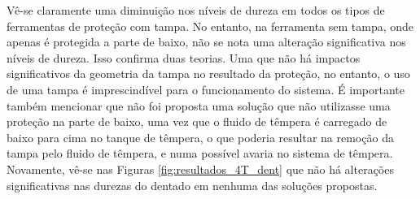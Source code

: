 \newpage
\par
Vê-se claramente uma diminuição nos níveis de dureza em todos os tipos de ferramentas de proteção com tampa. No entanto, na ferramenta sem tampa, onde apenas é protegida a parte de baixo, não se nota uma alteração significativa nos níveis de dureza. Isso confirma duas teorias. Uma que não há impactos significativos da geometria da tampa no resultado da proteção, no entanto, o uso de uma tampa é imprescindível para o funcionamento do sistema. É importante também mencionar que não foi proposta uma solução que não utilizasse uma proteção na parte de baixo, uma vez que o fluido de têmpera é carregado de baixo para cima no tanque de têmpera, o que poderia resultar na remoção da tampa pelo fluido de têmpera, e numa possível avaria no sistema de têmpera. Novamente, vê-se nas Figuras \ref{fig:resultados_4T_dent} que não há alterações significativas nas durezas do dentado em nenhuma das soluções propostas.
